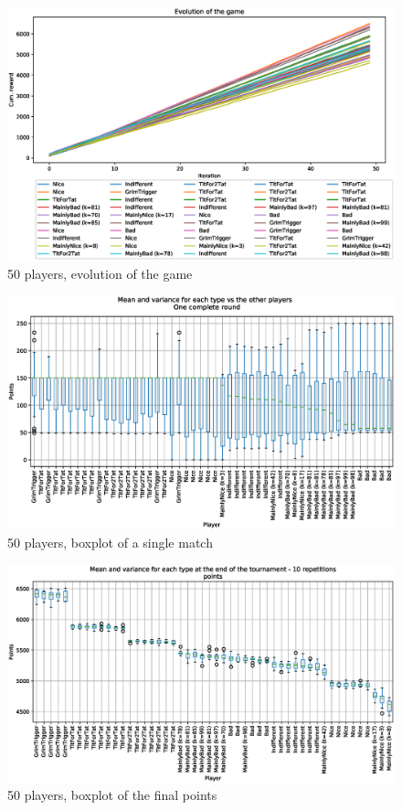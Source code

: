 \documentclass[journal,10pt,twoside]{IEEEtran}
\begin{document}
\begin{figure}[!ht]
    \centering
    \includegraphics[width=1\columnwidth]{../img/ipdmp/ipdmp-evolution-of-game-50}
    \caption{50 players, evolution of the game}
    \label{fig:ipdmp50evo}
\end{figure}

\begin{figure}[!ht]
    \centering
    \includegraphics[width=1\columnwidth]{../img/ipdmp/ipdmp-boxplot-single-match-50}
    \caption{50 players, boxplot of a single match}
    \label{fig:ipdmp50boxsingle}
\end{figure}

\begin{figure}[!ht]
    \centering
    \includegraphics[width=1\columnwidth]{../img/ipdmp/ipdmp-boxplot-final-points-50}
    \caption{50 players, boxplot of the final points}
    \label{fig:ipdmp50boxfinal}
\end{figure}
\end{document}
